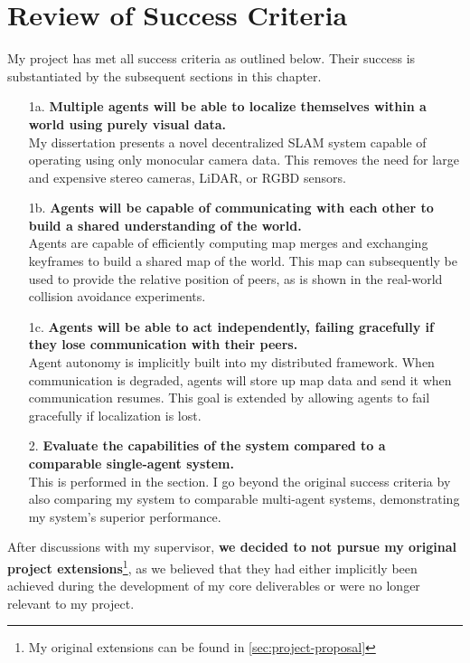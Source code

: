 

\label{sec:4}

\section{Review of Success Criteria}
\label{sec:review-of-success-criteria}
My project has met all success criteria as outlined below. Their success is substantiated by the subsequent sections in this chapter.\noparskip
{
    \begin{enumerate}[font=\bfseries]
        \item[1a.]\textbf{Multiple agents will be able to localize themselves within a world using purely visual data.} \\
        My dissertation presents a novel decentralized SLAM system capable of operating using only monocular camera data. This removes the need for large and expensive stereo cameras, LiDAR, or RGBD sensors.
        \label{success-criteria:1a}

        \item[1b.]\textbf{Agents will be capable of communicating with each other to build a shared understanding of the world.} \\
        Agents are capable of efficiently computing map merges and exchanging keyframes to build a shared map of the world. This map can subsequently be used to provide the relative position of peers, as is shown in the real-world collision avoidance experiments.
        \label{success-criteria:1b}

        \item[1c.]\textbf{Agents will be able to act independently, failing gracefully if they lose communication with their peers.} \\
        Agent autonomy is implicitly built into my distributed framework. When communication is degraded, agents will store up map data and send it when communication resumes. This goal is extended by allowing agents to fail gracefully if localization is lost.
        \label{success-criteria:1c}

        \item[2.]\textbf{Evaluate the capabilities of the system compared to a comparable single-agent system.} \\
        This is performed in the  section. I go beyond the original success criteria by also comparing my system to comparable multi-agent systems, demonstrating my system's superior performance.
        \label{success-criteria:2}

    \end{enumerate}
}
After discussions with my supervisor, \textbf{we decided to not pursue my original project extensions}\footnote[1]{My original extensions can be found in \autoref{sec:project-proposal}}, as we believed that they had either implicitly been achieved during the development of my core deliverables or were no longer relevant to my project.

